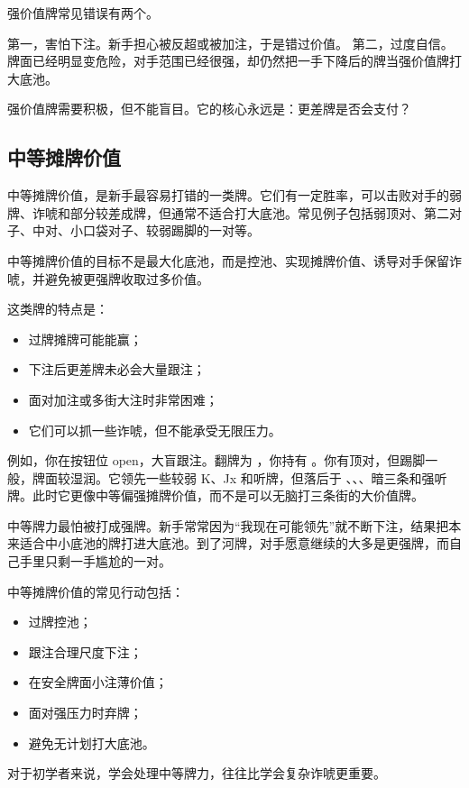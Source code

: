 强价值牌常见错误有两个。

第一，害怕下注。新手担心被反超或被加注，于是错过价值。
第二，过度自信。牌面已经明显变危险，对手范围已经很强，却仍然把一手下降后的牌当强价值牌打大底池。

强价值牌需要积极，但不能盲目。它的核心永远是：更差牌是否会支付？

\subsection{中等摊牌价值}

中等摊牌价值，是新手最容易打错的一类牌。它们有一定胜率，可以击败对手的弱牌、诈唬和部分较差成牌，但通常不适合打大底池。常见例子包括弱顶对、第二对子、中对、小口袋对子、较弱踢脚的一对等。

中等摊牌价值的目标不是最大化底池，而是控池、实现摊牌价值、诱导对手保留诈唬，并避免被更强牌收取过多价值。

这类牌的特点是：

\begin{itemize}
\item 过牌摊牌可能能赢；
\item 下注后更差牌未必会大量跟注；
\item 面对加注或多街大注时非常困难；
\item 它们可以抓一些诈唬，但不能承受无限压力。
\end{itemize}

例如，你在按钮位 open，大盲跟注。翻牌为 ，你持有 。你有顶对，但踢脚一般，牌面较湿润。它领先一些较弱 K、Jx 和听牌，但落后于 、、、暗三条和强听牌。此时它更像中等偏强摊牌价值，而不是可以无脑打三条街的大价值牌。

中等牌力最怕被打成强牌。新手常常因为“我现在可能领先”就不断下注，结果把本来适合中小底池的牌打进大底池。到了河牌，对手愿意继续的大多是更强牌，而自己手里只剩一手尴尬的一对。

中等摊牌价值的常见行动包括：

\begin{itemize}
\item 过牌控池；
\item 跟注合理尺度下注；
\item 在安全牌面小注薄价值；
\item 面对强压力时弃牌；
\item 避免无计划打大底池。
\end{itemize}

对于初学者来说，学会处理中等牌力，往往比学会复杂诈唬更重要。

